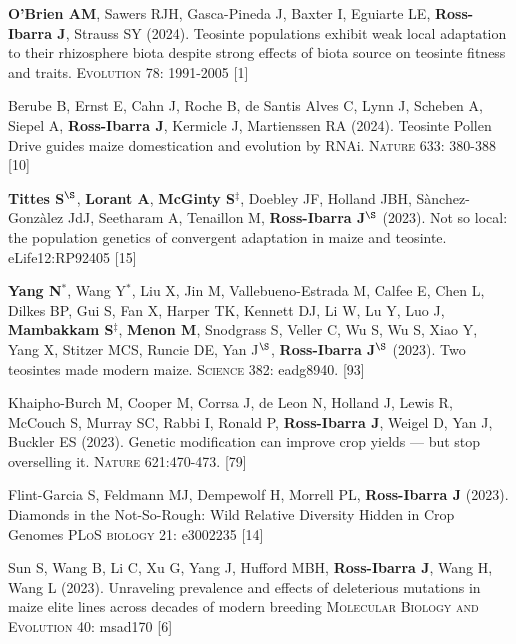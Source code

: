 \documentclass[letterpaper,10pt]{article}
\begin{document}
\begin{etaremune}
\item \textbf{O'Brien AM},  Sawers RJH, Gasca-Pineda J, Baxter I, Eguiarte LE, \textbf{Ross-Ibarra J}, Strauss SY (2024).  Teosinte populations exhibit weak local adaptation to their rhizosphere biota despite strong effects of biota source on teosinte fitness and traits. \textsc{Evolution} 78: 1991-2005  
 [1]\\

\item Berube B, Ernst E, Cahn J, Roche B, de Santis Alves C, Lynn J, Scheben A, Siepel A, \textbf{Ross-Ibarra J}, Kermicle J, Martienssen RA (2024). Teosinte Pollen Drive guides maize domestication and evolution by RNAi. \textsc{Nature} 633: 380-388 
 [10]\\

\item \textbf{Tittes S}$^\S$, \textbf{Lorant A}, \textbf{McGinty S}$^\ddagger$, Doebley JF,  Holland JBH, S\`{a}nchez-Gonz\`{a}lez JdJ, Seetharam A, Tenaillon M, \textbf{Ross-Ibarra J}$^\S$ (2023). Not so local: the population genetics of convergent adaptation in maize and teosinte. eLife12:RP92405 %
 [15]\\

\item \textbf{Yang N}$^*$, Wang Y$^*$,  Liu X, Jin M, Vallebueno-Estrada M, Calfee E, Chen L, Dilkes BP, Gui S, Fan X, Harper TK, Kennett DJ, Li W, Lu Y, Luo J, \textbf{Mambakkam S}$^\ddagger$, \textbf{Menon M}, Snodgrass S, Veller C, Wu S, Wu S, Xiao Y, Yang X, Stitzer MCS, Runcie DE, Yan J$^\S$, \textbf{Ross-Ibarra J}$^\S$ (2023). Two teosintes made modern maize. \textsc{Science} 382: eadg8940.
 [93]\\

\item Khaipho-Burch M, Cooper M, Corrsa J, de Leon N, Holland J, Lewis R, McCouch S, Murray SC, Rabbi I, Ronald P, \textbf{Ross-Ibarra J}, Weigel D, Yan J, Buckler ES (2023). Genetic modification can improve crop yields --- but stop overselling it. \textsc{Nature} 621:470-473.
 [79]\\

\item Flint-Garcia S,  Feldmann MJ, Dempewolf H,  Morrell PL, \textbf{Ross-Ibarra J} (2023). Diamonds in the Not-So-Rough: Wild Relative Diversity Hidden in Crop Genomes \textsc{PLoS biology} 21: e3002235	
 [14]\\

\item Sun S, Wang B, Li C, Xu G, Yang J, Hufford MBH, \textbf{Ross-Ibarra J}, Wang H, Wang L (2023). Unraveling prevalence and effects of deleterious mutations in maize elite lines across decades of modern breeding \textsc{Molecular Biology and Evolution} 40: msad170
 [6]\\


\end{etaremune}
\end{document}
